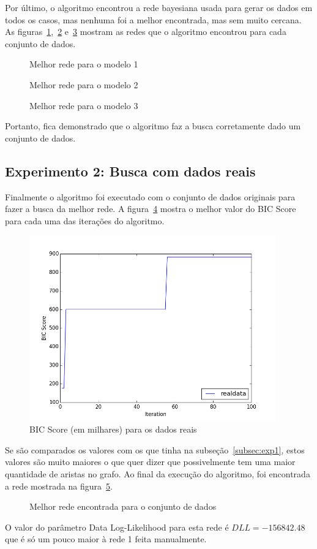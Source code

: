 	Por último, o algoritmo encontrou a rede bayesiana usada para gerar os dados em todos os casos, mas nenhuma foi a melhor encontrada, mas sem muito cercana. As figuras~\ref{fig:rede1algo},~\ref{fig:rede2algo} e~\ref{fig:rede3algo} mostram as redes que o algoritmo encontrou para cada conjunto de dados.
	\begin{figure}[H]
		\centering
		
		\caption{Melhor rede para o modelo 1}
		\label{fig:rede1algo}
	\end{figure}
	\begin{figure}[H]
		\centering
		
		\caption{Melhor rede para o modelo 2}
		\label{fig:rede2algo}
	\end{figure}
	\begin{figure}[H]
		\centering
		
		\caption{Melhor rede para o modelo 3}
		\label{fig:rede3algo}
	\end{figure}
	Portanto, fica demonstrado que o algoritmo faz a busca corretamente dado um conjunto de dados.

\subsection{Experimento 2: Busca com dados reais}
	Finalmente o algoritmo foi executado com o conjunto de dados originais para fazer a busca da melhor rede. A figura~\ref{fig:busca} mostra o melhor valor do BIC Score para cada uma das iterações do algoritmo.
	\begin{figure}[H]
		\centering
		\includegraphics[height=8cm]{images/real_data}
		\caption{BIC Score (em milhares) para os dados reais}
		\label{fig:busca}
	\end{figure}
	Se são comparados os valores com os que tinha na subseção~\ref{subsec:exp1}, estos valores são muito maiores o que quer dizer que possivelmente tem uma maior quantidade de aristas no grafo. Ao final da execução do algoritmo, foi encontrada a rede mostrada na figura~\ref{fig:bestnet}.
	\begin{figure}[H]
		\centering
		
		\caption{Melhor rede encontrada para o conjunto de dados}
		\label{fig:bestnet}
	\end{figure}
	O valor do parâmetro Data Log-Likelihood para esta rede é $DLL = -156842.48$ que é só um pouco maior à rede 1 feita manualmente.
\clearpage
